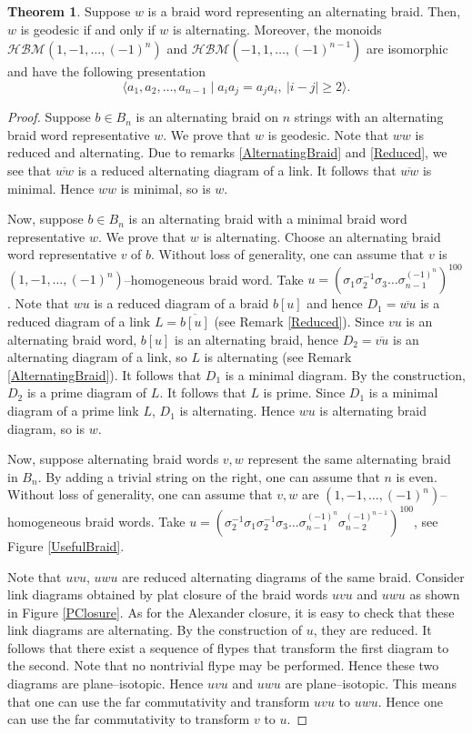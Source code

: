 \documentclass[11pt]{amsart}
\theoremstyle{plain}
\theoremstyle{definition}
\newtheorem{Theorem}{Theorem}[section]
\numberwithin{equation}{section}
\begin{document}
\begin{Theorem}\label{ProofOfConjectureForAlternatingBraids}
Suppose $w$ is a braid word representing an alternating braid. Then, $w$ is geodesic if and only if $w$ is alternating. Moreover, the monoids $\mathcal{HBM}(1,-1,\ldots,(-1)^n)$ and $\mathcal{HBM}(-1,1,\ldots,(-1)^{n-1})$ are isomorphic and have the following presentation
$$\langle a_1, a_2, \ldots, a_{n-1} \mid a_ia_j=a_ja_i, \ |i-j|\geq 2\rangle.$$
\end{Theorem}
\begin{proof}
Suppose $b \in B_n$ is an alternating braid on $n$ strings with an alternating braid word representative $w$. We prove that $w$ is geodesic. Note that $ww$ is reduced and alternating. Due to remarks \ref{AlternatingBraid} and \ref{Reduced}, we see that $\overline{ww}$ is a reduced alternating diagram of a link. It follows that $\overline{ww}$ is minimal. Hence $ww$ is minimal, so is $w$.

Now, suppose $b \in B_n$ is an alternating braid with a minimal braid word representative $w$. We prove that $w$ is alternating. Choose an alternating braid word representative $v$ of $b$. Without loss of generality, one can assume that $v$ is $(1,-1, \ldots, (-1)^n)$--homogeneous braid word. Take $u = (\sigma_1\sigma_2^{-1}\sigma_3\ldots \sigma_{n-1}^{(-1)^n})^{100}$. Note that $wu$ is a reduced diagram of a braid $b[u]$ and hence $D_1 = \overline{wu}$ is a reduced diagram of a link $L = \overline{b[u]}$ (see Remark \ref{Reduced}). Since $vu$ is an alternating braid word, $b[u]$ is an alternating braid, hence $D_2 = \overline{vu}$ is an alternating diagram of a link, so $L$ is alternating (see Remark \ref{AlternatingBraid}). It follows that $D_1$ is a minimal diagram. By the construction, $D_2$ is a prime diagram of $L$. It follows that $L$ is prime. Since $D_1$ is a minimal diagram of a prime link $L$, $D_1$ is alternating. Hence $wu$ is alternating braid diagram, so is $w$.

Now, suppose alternating braid words $v,w$ represent the same alternating braid in $B_n$. By adding a trivial string on the right, one can assume that $n$ is even. Without loss of generality, one can assume that $v,w$ are $(1,-1, \ldots, (-1)^n)$--homogeneous braid words. Take $u = (\sigma_2^{-1}\sigma_1\sigma_2^{-1}\sigma_3\ldots \sigma_{n-1}^{(-1)^n} \sigma_{n-2}^{(-1)^{n-1}})^{100}$, see Figure \ref{UsefulBraid}. 

Note that $uvu$, $uwu$ are reduced alternating diagrams of the same braid. Consider link diagrams obtained by plat closure of the braid words $uvu$ and $uwu$ as shown in Figure \ref{PClosure}. As for the Alexander closure, it is easy to check that these link diagrams are alternating. By the construction of $u$, they are reduced. It follows that there exist a sequence of flypes that transform the first diagram to the second. Note that no nontrivial flype may be performed. Hence these two diagrams are plane--isotopic. Hence $uvu$ and $uwu$ are plane--isotopic. This means that one can use the far commutativity and transform $uvu$ to $uwu$. Hence one can use the far commutativity to transform $v$ to $u$.
\end{proof}
\end{document}

